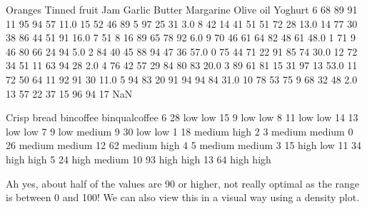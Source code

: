 \documentclass[letterpaper,10pt,english]{jupyterBook}
\begin{document}
\begin{sphinxVerbatim}[commandchars=\\\{\}]
    Oranges  Tinned fruit  Jam  Garlic  Butter  Margarine  Olive oil  Yoghurt  \PYGZbs{}
6        68            89   91      11      95         94         57     11.0   
15       52            46   89       5      97         25         31      3.0   
8        42            14   41      51      51         72         28     13.0   
14       77            30   38      86      44         51         91     16.0   
7        51             8   16      89      65         78         92      6.0   
9        70            46   61      64      82         48         61     48.0   
1        71             9   46      80      66         24         94      5.0   
2        84            40   45      88      94         47         36     57.0   
0        75            44   71      22      91         85         74     30.0   
12       72            34   51      11      63         94         28      2.0   
4        76            42   57      29      84         80         83     20.0   
3        89            61   81      15      31         97         13     53.0   
11       72            50   64      11      92         91         30     11.0   
5        94            83   20      91      94         94         84     31.0   
10       78            53   75       9      68         32         48      2.0   
13       57            22   37      15      96         94         17      NaN   

    Crisp bread bin\PYGZus{}coffee bin\PYGZus{}qual\PYGZus{}coffee  
6            28        low             low  
15            9        low             low  
8            11        low             low  
14           13        low             low  
7             9        low          medium  
9            30        low             low  
1            18     medium            high  
2             3     medium          medium  
0            26     medium          medium  
12           62     medium            high  
4             5     medium          medium  
3            15       high             low  
11           34       high            high  
5            24       high          medium  
10           93       high            high  
13           64       high            high  
\end{sphinxVerbatim}

\sphinxAtStartPar
Ah yes, about half of the values are 90 or higher, not really optimal as the range is between 0 and 100!
We can also view this in a visual way using a density plot.

\begin{sphinxVerbatim}[commandchars=\\\{\}]
\PYG{p}{[}\PYG{p}{]} 
\end{sphinxVerbatim}
\end{document}
